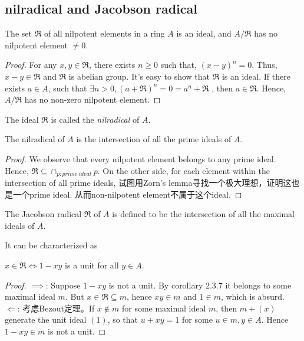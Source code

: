 \documentclass[11pt,fleqn]{book} %
\begin{document}
\begin{CJK}{UTF8}{gkai}
\section{nilradical and Jacobson radical}
\begin{proposition}
	The set $\mathfrak{R}$ of all nilpotent elements in a ring $A$ is an ideal, and $A / \mathfrak{R}$ has no nilpotent element $\neq 0$.
\end{proposition}
\begin{proof}
	For any $x,y \in \mathfrak{R}$, there exists $n \geq 0$ such that, $(x-y)^n = 0$. Thus, $x - y \in \mathfrak{R}$ and $\mathfrak{R}$ is abelian group. It's easy to show that $\mathfrak{R}$ is an ideal.
	If there exists $a \in A$, such that $\exists n > 0, (a + \mathfrak{R})^n = 0 = a^n + \mathfrak{R}$ , then $a \in \mathfrak{R}$. Hence, $A / \mathfrak{R}$ has no non-zero nilpotent element.
\end{proof}

The ideal $\mathfrak{R}$ is called the {\it nilradical} of $A$.
\begin{proposition}
	The nilradical of $A$ is the intersection of all the prime ideals of $A$.
\end{proposition}
\begin{proof}
	We observe that every nilpotent element belongs to any prime ideal. Hence, $\mathfrak{R} \subseteq \cap_{p:prime \ ideal}p$.
	On the other side, for each element within the intersection of all prime ideals, 试图用Zorn's lemma寻找一个极大理想，证明这也是一个prime ideal. 从而non-nilpotent element不属于这个ideal.
\end{proof}

\begin{definition}
	 The Jacobson radical $\mathfrak{R}$ of $A$ is defined to be the intersection of all the maximal ideals of $A$.
\end{definition}
It can be characterized as
\begin{proposition}
	$x\in \mathfrak{R} \iff 1 - xy$ is a unit for all $y \in A$.
\end{proposition}
\begin{proof}
	$\implies$: Suppose $1-xy$ is not a unit. By corollary 2.3.7 it belongs to some maximal ideal $m$. But $x\in \mathfrak{R}\subseteq m$, hence $xy \in m$ and $1 \in m$, which is absurd. \\
	$\Leftarrow$: 考虑Bezout定理。If $x\notin m$ for some maximal ideal $m$, then $m + (x)$ generate the unit ideal $(1)$, so that $u + xy = 1$ for some $u \in m, y \in A$. Hence $1 - xy \in m$ is not a unit.
\end{proof}


\end{CJK}
\end{document}
